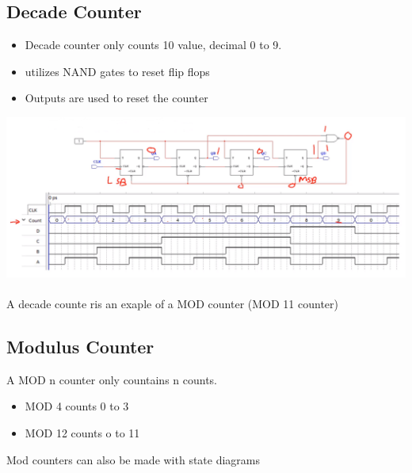 \documentclass[a4paper,12pt]{article}
\begin{document}
            \subsection{Decade Counter}
                \begin{itemize}
                    \item Decade counter only counts 10 value, decimal 0 to 9.
                    \item utilizes NAND gates to reset flip flops
                    \item Outputs are used to reset the counter
                \end{itemize}
                \includegraphics[width=15cm]{Decade1.png}\\\\
                A decade counte ris an exaple of a MOD counter (MOD 11 counter)
                
            \subsection{Modulus Counter}
                A MOD n counter only countains n counts.
                \begin{itemize}
                    \item MOD 4 counts 0 to 3
                    \item MOD 12 counts o to 11
                \end{itemize}
                Mod counters can also be made with state diagrams
\end{document}

